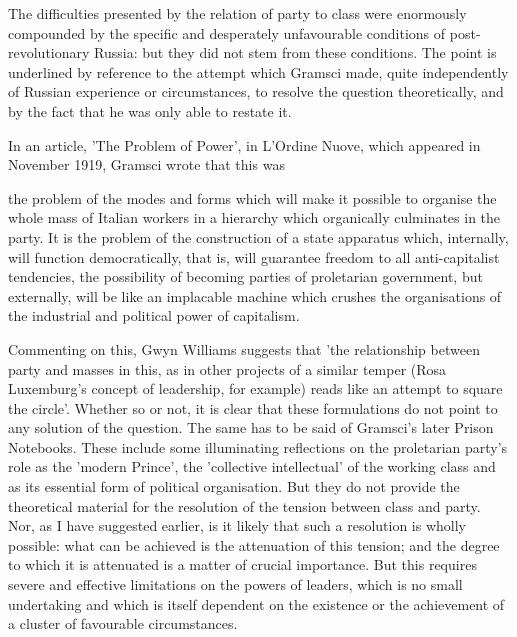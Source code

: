 The difficulties presented by the relation of party to class were enormously compounded by the specific and desperately unfavourable conditions of post-revolutionary Russia: but they did not stem from these conditions. The point is underlined by reference to the attempt which Gramsci made, quite independently of Russian experience or circumstances, to resolve the question theoretically, and by the fact that he was only able to restate it.

In an article, 'The Problem of Power', in L'Ordine Nuove, which appeared in November 1919, Gramsci wrote that this was
\begin{displayquote}
    the problem of the modes and forms which will make it possible to organise the whole mass of Italian workers in a hierarchy which organically culminates in the party. It is the problem of the construction of a state apparatus which, internally, will function democratically, that is, will guarantee freedom to all anti-capitalist tendencies, the possibility of becoming parties of proletarian government, but externally, will be like an implacable machine which crushes the organisations of the industrial and political power of capitalism.
\end{displayquote}

Commenting on this, Gwyn Williams suggests that 'the relationship between party and masses in this, as in other projects of a similar temper (Rosa Luxemburg's concept of leadership, for example) reads like an attempt to square the circle'. Whether so or not, it is clear that these formulations do not point to any solution of the question. The same has to be said of Gramsci's later Prison Notebooks. These include some illuminating reflections on the proletarian party's role as the 'modern Prince', the 'collective intellectual' of the working class and as its essential form of political organisation. But they do not provide the theoretical material for the resolution of the tension between class and party. Nor, as I have suggested earlier, is it likely that such a resolution is wholly possible: what can be achieved is the attenuation of this tension; and the degree to which it is attenuated is a matter of crucial importance. But this requires  severe and effective limitations on the powers of leaders, which is no small undertaking and which is itself dependent on the existence or the achievement of a cluster of favourable circumstances.

